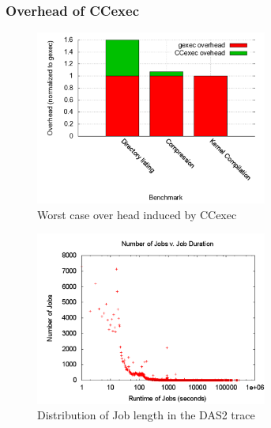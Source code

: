 \subsubsection{Overhead of CCexec} %
\label{sub:overhead_of_ccexec}
\begin{figure}[ht]
\centering
\begin{center}
\includegraphics[width=3.0in]{graphs/CCexecVsgexec1.pdf}
\vspace{-0.1in}
\caption{{\normalsize Worst case over head induced by CCexec}\label{fig:ccexec-overhead}}
\vspace{-0.1in}
\end{center}
\end{figure}
\begin{figure}[ht]
\centering
\begin{center}
\includegraphics[width=3.0in]{graphs/joblength1.pdf}
\vspace{-0.1in}
\caption{{\normalsize Distribution of Job length in the DAS2 trace}\label{fig:joblength-trace}}
\vspace{-0.1in}
\end{center}
\end{figure}
